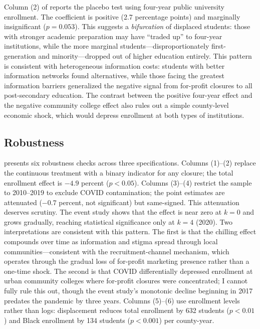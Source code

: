\documentclass[12pt]{article}
\begin{document}
Column (2) of  reports the placebo test using four-year public university enrollment. The coefficient is positive (2.7 percentage points) and marginally insignificant ($p = 0.053$). This suggests a \textit{bifurcation} of displaced students: those with stronger academic preparation may have ``traded up'' to four-year institutions, while the more marginal students---disproportionately first-generation and minority---dropped out of higher education entirely. This pattern is consistent with heterogeneous information costs: students with better information networks found alternatives, while those facing the greatest information barriers generalized the negative signal from for-profit closures to all post-secondary education. The contrast between the positive four-year effect and the negative community college effect also rules out a simple county-level economic shock, which would depress enrollment at both types of institutions.

\subsection{Robustness}

 presents six robustness checks across three specifications. Columns (1)--(2) replace the continuous treatment with a binary indicator for any closure; the total enrollment effect is $-4.9$ percent ($p < 0.05$). Columns (3)--(4) restrict the sample to 2010--2019 to exclude COVID contamination; the point estimates are attenuated ($-0.7$ percent, not significant) but same-signed. This attenuation deserves scrutiny. The event study shows that the effect is near zero at $k = 0$ and grows gradually, reaching statistical significance only at $k = 4$ (2020). Two interpretations are consistent with this pattern. The first is that the chilling effect compounds over time as information and stigma spread through local communities---consistent with the recruitment-channel mechanism, which operates through the gradual loss of for-profit marketing presence rather than a one-time shock. The second is that COVID differentially depressed enrollment at urban community colleges where for-profit closures were concentrated; I cannot fully rule this out, though the event study's monotonic decline beginning in 2017 predates the pandemic by three years. Columns (5)--(6) use enrollment levels rather than logs: displacement reduces total enrollment by 632 students ($p < 0.01$) and Black enrollment by 134 students ($p < 0.001$) per county-year.
\end{document}
